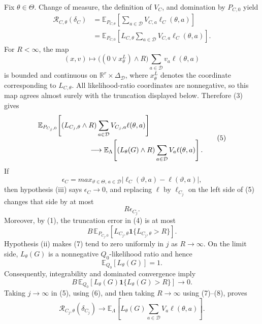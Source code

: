 Fix \(\theta\in\Theta\).  Change of measure, the definition of \(V_C\), and domination by \(P_{C,0}\) yield
\[
 \begin{aligned}
 \mathcal R_{C,\theta}(\delta_C)
 &=\mathbb E_{P_{C,\theta}}\!\left[
     \sum_{a\in\mathcal D}V_{C,a}\ell_C(\theta,a)
   \right]\\
 &=\mathbb E_{P_{C,0}}\!\left[
     L_{C,\theta}\sum_{a\in\mathcal D}V_{C,a}\ell_C(\theta,a)
   \right].
 \end{aligned}
 \tag{4}
\]
For \(R<\infty\), the map
\[
 (x,v)\longmapsto
 \bigl((0\vee x_\theta^{L})\wedge R\bigr)
 \sum_{a\in\mathcal D}v_a\ell(\theta,a)
\]
is bounded and continuous on \(\mathbb R^r\times\Delta_{\mathcal D}\), where \(x_\theta^{L}\) denotes the coordinate corresponding to \(L_{C,\theta}\).  All likelihood-ratio coordinates are nonnegative, so this map agrees almost surely with the truncation displayed below.  Therefore (3) gives
\[
 \begin{aligned}
 &\mathbb E_{P_{C_j,0}}\!\left[
   (L_{C_j,\theta}\wedge R)
   \sum_{a\in\mathcal D}V_{C_j,a}\ell(\theta,a)
 \right]\\
 &\hspace{25mm}\longrightarrow
 \mathbb E_{\Lambda}\!\left[
   (L_\theta(G)\wedge R)
   \sum_{a\in\mathcal D}V_a\ell(\theta,a)
 \right].
 \end{aligned}
 \tag{5}
\]
If
\[
 \epsilon_C=max_{\vartheta\in\Theta,\,a\in\mathcal D}
 |\ell_C(\vartheta,a)-\ell(\vartheta,a)|,
\]
then hypothesis (iii) says \(\epsilon_C\to0\), and replacing \(\ell\) by \(\ell_{C_j}\) on the left side of (5) changes that side by at most
\[
 R\epsilon_{C_j}.
 \tag{6}
\]
Moreover, by (1), the truncation error in (4) is at most
\[
 B\,\mathbb E_{P_{C_j,0}}\!\left[
 L_{C_j,\theta}\mathbf 1\{L_{C_j,\theta}>R\}
 \right].
 \tag{7}
\]
Hypothesis (ii) makes (7) tend to zero uniformly in \(j\) as \(R\to\infty\).  On the limit side, \(L_\theta(G)\) is a nonnegative \(Q_0\)-likelihood ratio and hence
\[
 \mathbb E_{Q_0}[L_\theta(G)]=1.
\]
Consequently, integrability and dominated convergence imply
\[
 B\,\mathbb E_{Q_0}\!\left[
 L_\theta(G)\mathbf 1\{L_\theta(G)>R\}
 \right]\longrightarrow0.
 \tag{8}
\]
Taking \(j\to\infty\) in (5), using (6), and then taking \(R\to\infty\) using (7)--(8), proves
\[
 \mathcal R_{C_j,\theta}(\delta_{C_j})
 \longrightarrow
 \mathbb E_{\Lambda}\!\left[
 L_\theta(G)\sum_{a\in\mathcal D}V_a\ell(\theta,a)
 \right].
 \tag{9}
\]

